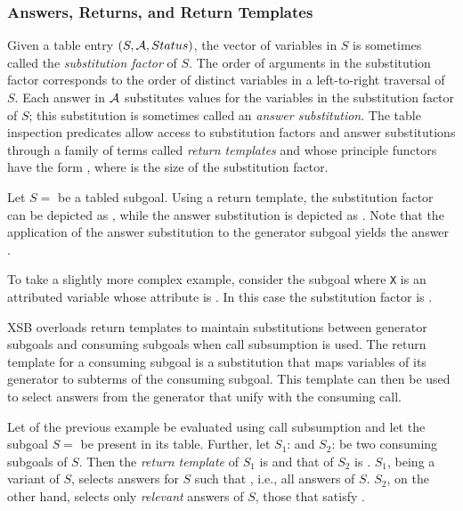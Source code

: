 \begin{description}
\subsubsection*{Answers, Returns, and Return Templates}
%
%
Given a table entry $(S,{\cal A},Status)$, the vector of variables in $S$ is
sometimes called the {\em substitution factor} of $S$.  The order of
arguments in the substitution factor corresponds to the order of
distinct variables in a left-to-right traversal of $S$.  Each answer
in ${\cal A}$ substitutes values for the variables in the substitution
factor of $S$; this substitution is sometimes called an {\em answer
  substitution}.  The table inspection predicates allow access to
substitution factors and answer substitutions through a family of
terms called {\em return templates} and whose principle functors have
the form \retn, where  is the size of the substitution factor.

\begin{example}
Let $S =$  be a tabled subgoal.  Using a return
template, the substitution factor can be depicted as ,
while the answer substitution  is depicted as
.  Note that the application of the answer substitution
to the generator subgoal yields the answer .

To take a slightly more complex example, consider the subgoal
 where {\tt X} is an attributed variable whose attribute is
.  In this case the substitution factor is
.\fillBox
\end{example}

XSB overloads return templates to maintain substitutions between
generator subgoals and consuming subgoals when call subsumption is
used.  The return template for a consuming subgoal is a substitution
that maps variables of its generator to subterms of the consuming
subgoal.  This template can then be used to select answers from the
generator that unify with the consuming call.

\begin{example}
Let  of the previous example be evaluated using call
subsumption and let the subgoal $S =$  be present in
its table.  Further, let $S_1$:  and $S_2$:
 be two consuming subgoals of $S$\@.  Then the
\emph{return template} of $S_1$ is  and that of $S_2$
is .  $S_1$, being a variant of $S$, selects answers
for $S$ such that \@, i.e., all answers of $S$.
$S_2$, on the other hand, selects only \emph{relevant} answers of $S$,
those that satisfy .\fillBox
\end{example}



\end{description}
